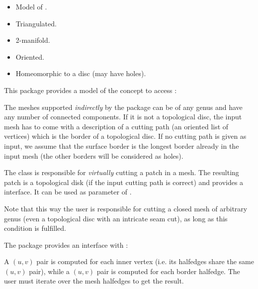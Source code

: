 \begin{itemize}

\item Model of .

\item Triangulated.

\item 2-manifold.

\item Oriented.

\item Homeomorphic to a disc (may have holes).

\end{itemize}

This package provides a model of the  concept
to access : \\

The meshes supported \emph{indirectly} by the package can be of any genus and
have any number of connected components. If it is not a topological
disc, the input mesh has to come with a description of a cutting path (an oriented list of
vertices) which is the border of a topological disc.  If no cutting path is
given as input, we assume that the surface border is the longest border already
in the input mesh (the other borders will be considered as holes).

The 
class is responsible for \emph{virtually} cutting
a patch in a  mesh.
The resulting patch is a topological
disk (if the input cutting path is correct)
and provides a  interface. It can be used as
parameter of .

Note that this way the user is responsible for cutting a closed mesh of
arbitrary genus (even a topological disc with an intricate seam
cut), as long as this condition is fulfilled.

The package provides an interface with : \\



A $(u,v)$ pair is computed for
each inner vertex (i.e. its halfedges share the same $(u,v)$ pair),
while a $(u,v)$ pair is computed for each border halfedge.
The user must iterate over the mesh halfedges to get the result.


